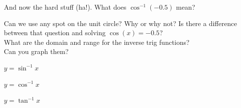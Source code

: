 \documentclass[11pt]{article}
\begin{document}
    \vspace{2ex}

    \noindent And now the hard stuff (ha!). What does $\displaystyle \cos^{-1}(-0.5)$ mean?\\[2ex]

    \newpage

    \noindent Can we use any spot on the unit circle? Why or why not? Is there a difference between that question and solving $\displaystyle \cos(x) = -0.5$?\\[2ex]

    \noindent What are the domain and range for the inverse trig functions?\\[2ex]

    \noindent Can you graph them?

    \begin{center}
        \begin{minipage}{0.32\textwidth}
            \centering $\displaystyle y = \sin^{-1} x$\\[1ex]
            \smallgraph
        \end{minipage}
        \begin{minipage}{0.32\textwidth}
            \centering $\displaystyle y = \cos^{-1} x$\\[1ex]
            \smallgraph
        \end{minipage}
        \begin{minipage}{0.32\textwidth}
            \centering $\displaystyle y = \tan^{-1} x$\\[1ex]
            \smallgraph
        \end{minipage}
    \end{center}
\end{document}
